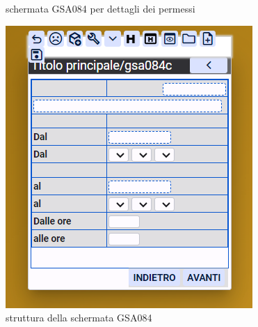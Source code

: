 \documentclass[target=bach,aauheader=,style=]{thud}
\begin{document}
\begin{figure}[h]
\begin{minipage}{0.3\textwidth}
        \caption{schermata GSA084 per dettagli dei permessi}
    \end{minipage}
    \hfill
    \begin{minipage}{0.3\textwidth}
        \centering
        \includegraphics[width=\linewidth]{screenshot/Struttura_gsa084.png}
        \caption{struttura della schermata GSA084}
    \end{minipage}
\end{figure}
\end{document}

